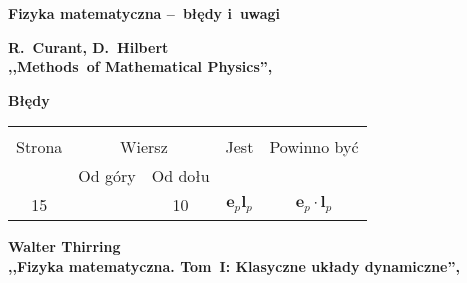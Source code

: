 \documentclass[a4paper,11pt]{article}
\newcommand{\spaceOne}{2em}
\newcommand{\spaceTwo}{1em}
\newcommand{\mbf}{\mathbf} %
\newcommand{\tb}{\textbf}
\newcommand{\Center}[1]{\begin{center} #1 \end{center}}
\newcommand{\CenterTB}[1]{\Center{\tb{#1}}}
\newcommand{\Main}[1]{ \begin{center} {\LARGE \tb{#1} } \end{center} }
\newcommand{\Work}[1]{ \begin{center} {\large \tb{#1}} \end{center} }
\newcommand{\eb}{\mbf{e}} %
\newcommand{\lb}{\mbf{l}} %
\begin{document}
\Main{Fizyka matematyczna --~błędy i~uwagi}

\vspace{\spaceTwo}



\Work{
  R.~Curant, D.~Hilbert \\
  ,,Methods~of Mathematical Physics'', \cite{CourantHilbert53} }


\CenterTB{Błędy}
\begin{center}
  \begin{tabular}{|c|c|c|c|c|}
    \hline
    & \multicolumn{2}{c|}{} & & \\
    Strona & \multicolumn{2}{c|}{Wiersz} & Jest
                              & Powinno być \\ \cline{2-3}
    & Od góry & Od dołu & & \\
    \hline
    15 & & 10 & $\eb_{ p } \lb_{ p }$ & $\eb_{ p } \cdot \lb_{ p }$ \\
    \hline
  \end{tabular}
\end{center}

\vspace{\spaceOne}





\Work{
  Walter Thirring \\
  ,,Fizyka matematyczna. Tom~I: Klasyczne układy dynamiczne'', \cite{Thi85a}}
\end{document}
